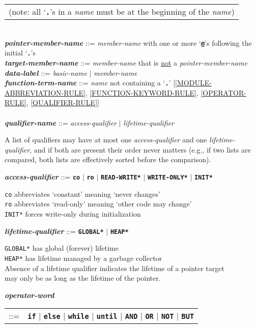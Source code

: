 \documentclass[12pt]{article}
\newcommand{\TT}[1]{{\tt \bfseries #1}}
\newcommand{\ttkey}[1]{{\tt \bfseries #1}}
\newcommand{\emkey}[1]{{\em \bfseries #1}}
\newcommand{\ttakey}[1]{{\tt \bfseries *#1*}}
\newenvironment{indpar}[1][0.3in]%
	{\begin{list}{}%
		     {\setlength{\itemsep}{0in}%
		      \setlength{\topsep}{0in}%
		      \setlength{\parsep}{1ex}%
		      \setlength{\labelwidth}{#1}%
		      \setlength{\leftmargin}{#1}%
		      \addtolength{\leftmargin}{\labelsep}}%
	 \item}%
	{\end{list}}
\begin{document}
\begin{indpar}
\begin{tabular}[t]{@{}l@{}}
			(note: all `\TT{.}'s in a {\em name} must be at
			 the beginning of the {\em name})
			\end{tabular} \\
\emkey{pointer-member-name}\label{POINTER-MEMBER-NAME} ::=
    {\em member-name} with one or more `\TT{@}'s
    following the initial `\TT{.}'s \\
\emkey{target-member-name}\label{TARGET-MEMBER-NAME} ::=
    {\em member-name} that is \underline{not} a {\em pointer-member-name}
\\[1ex]
\emkey{data-label}\label{DATA-LABEL} ::=
    {\em basic-name} $|$ {\em member-name}
\\[1ex]
\emkey{function-term-name} ::= {\em name} not containing a `\TT{.}'
    \label{FUNCTION-TERM-NAME}
	[\ref{MODULE-ABBREVIATION-RULE},
	 \ref{FUNCTION-KEYWORD-RULE},
	 \ref{OPERATOR-RULE},
	 \ref{QUALIFIER-RULE}] \\
\\[1ex]
\emkey{qualifier-name}\label{QUALIFIER-NAME}
    ::= {\em access-qualifier} $|$ {\em lifetime-qualifier}
\begin{indpar}
A list of qualifiers may have at most one {\em access-qualifier}
and one {\em lifetime-qualifier}, and if both are present their
order never matters (e.g., if two lists are compared, both lists
are effectively sorted before the comparison).
\end{indpar}

\emkey{access-qualifier}\label{ACCESS-QUALIFIER}
    ::= \ttkey{co} $|$ \ttkey{ro} $|$ \ttakey{READ-WRITE}
                   $|$ \ttakey{WRITE-ONLY} $|$ \ttakey{INIT}
\begin{indpar}
{\tt co} abbreviates `constant' meaning `never changes' \\
{\tt ro} abbreviates `read-only' meaning `other code may change' \\
{\tt *INIT*} forces write-only during initialization
\end{indpar}

\emkey{lifetime-qualifier}\label{LIFETIME-QUALIFIER}
    ::= \ttakey{GLOBAL} $|$ \ttakey{HEAP}
\begin{indpar}
{\tt *GLOBAL*} has global (forever) lifetime \\
{\tt *HEAP*} has lifetime managed by a garbage collector \\
Absence of a lifetime qualifier indicates the lifetime of a pointer target \\
may only be as long as the lifetime of the pointer.
\end{indpar}
\emkey{operator-word}
    \begin{tabular}[t]{rl}
    ::= & \TT{if} $|$ \TT{else} $|$ \TT{while} $|$ \TT{until}
                  $|$ \TT{AND} $|$ \TT{OR}
		  $|$ \TT{NOT} $|$ \TT{BUT}
    \end{tabular}


\end{indpar}
\end{document}
